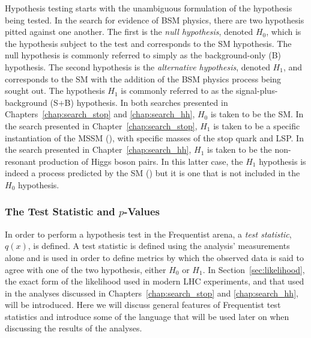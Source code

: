 Hypothesis testing starts with the unambiguous formulation of the hypothesis being
tested.
In the search for evidence of BSM physics, there are two hypothesis pitted
against one another.
The first is the \textit{null hypothesis}, denoted $H_0$, which is the hypothesis
subject to the test and corresponds to the SM hypothesis. The null hypothesis is commonly
referred to simply as the background-only (B) hypothesis.
The second hypothesis is the \textit{alternative hypothesis}, denoted $H_1$, and corresponds
to the SM with the addition of the BSM physics process being sought out.
The hypothesis $H_1$ is commonly referred to as the signal-plus-background (S+B) hypothesis.
In both searches presented in Chapters~\ref{chap:search_stop} and \ref{chap:search_hh},
$H_0$ is taken to be the SM.
In the search presented in Chapter~\ref{chap:search_stop}, $H_1$ is taken to be a specific
instantiation of the MSSM ({\color{red}{Section XXX}}), with specific masses of the
stop quark and LSP.
In the search presented in Chapter~\ref{chap:search_hh}, $H_1$ is taken to be the
non-resonant production of Higgs boson pairs.
In this latter case, the $H_1$ hypothesis is indeed a process predicted by the SM ({\color{red}{SECTION XXX about HH pheno and EWSB}}) but
it is one that is not included in the $H_0$ hypothesis.

%
%
\subsubsection{The Test Statistic and $p$-Values}

In order to perform a hypothesis test in the Frequentist arena, a \textit{test statistic}, $q(x)$,
is defined.
A test statistic is defined using the analysis' measurements alone and is
used in order to define metrics by which the observed data is said to agree with
one of the two hypothesis, either $H_0$ or $H_1$.
In Section~\ref{sec:likelihood}, the exact form of the likelihood used in modern LHC experiments,
and that used in the analyses discussed in Chapters~\ref{chap:search_stop} and \ref{chap:search_hh},
will be introduced.
Here we will discuss general features of Frequentist test statistics and introduce
some of the language that will be used later on when discussing the results of the
analyses.

